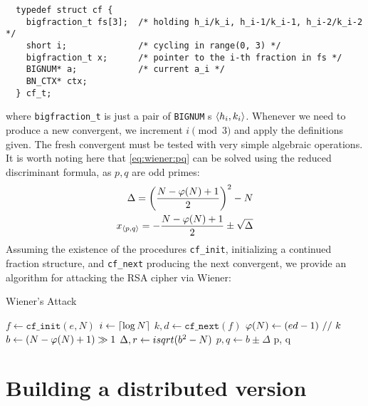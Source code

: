 \begin{verbatim}
  typedef struct cf {
    bigfraction_t fs[3];  /* holding h_i/k_i, h_i-1/k_i-1, h_i-2/k_i-2 */
    short i;              /* cycling in range(0, 3) */
    bigfraction_t x;      /* pointer to the i-th fraction in fs */
    BIGNUM* a;            /* current a_i */
    BN_CTX* ctx;
  } cf_t;
\end{verbatim}
where \texttt{bigfraction\_t} is just a pair of \texttt{BIGNUM} \!s
$\langle h_i, k_i\rangle$. Whenever we need to produce a new convergent, we increment
$i \pmod{3}$ and apply the definitions given. The fresh convergent must be
tested with very simple algebraic operations. It is worth noting here that
\ref{eq:wiener:pq} can be solved using the reduced discriminant formula, as
$p, q$ are odd primes:
\begin{align*}
\Delta = \left( \frac{N-\varphi(N) + 1}{2} \right)^2 - N \\
x_{\langle p , q\rangle} = - \frac{N - \varphi(N) + 1}{2} \pm \sqrt{\Delta}
\end{align*}
Assuming the existence of the procedures \texttt{cf\_init}, initializing a
continued fraction structure, and \texttt{cf\_next} producing the next
convergent, we provide an algorithm for attacking the RSA cipher via Wiener:

\begin{algorithm}[H]
  \caption{Wiener's Attack}
  \label{alg:wiener}
  \begin{algorithmic}[1]
    \State $f \gets  \texttt{cf\_init}(e, N)$
    \State $i \gets \lceil\log N\rceil$
    \State $k, d \gets \texttt{cf\_next}(f)$
      \EndIf
    \State $\varphi(N) \gets (ed - 1)\ //\ k$
      \EndIf
    \State $b \gets (N - \varphi(N) + 1) \gg 1$
    \State $\Delta, r \gets isqrt(b^2 - N)$
      \EndIf
    \State $p, q \gets b \pm \Delta$
    \State {}
    \EndWhile
    \State \Return p, q
  \end{algorithmic}
\end{algorithm}

\section{Building a distributed version}
